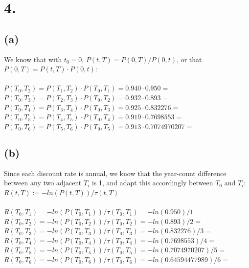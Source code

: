 \documentclass{article}
\begin{document}
\section*{4.}
{\Large 

\subsection*{(a)}
We know that with $t_0 = 0$, $P(t, T) = P(0, T) / P(0, t)$, or that \\
$P(0, T) = P(t, T) \cdot P(0, t)$: \\ \\
$P(T_0, T_2) = P(T_1, T_2) \cdot P(T_0, T_1) = 0.940 \cdot 0.950 = $  \\ 
$P (T_0, T_3) = P(T_2, T_3) \cdot P(T_0, T_2) = 0.932 \cdot 0.893 = $  \\
$P(T_0, T_4) = P(T_3, T_4) \cdot P(T_0, T_3) = 0.925 \cdot 0.832276 = $  \\
$P(T_0, T_5) = P(T_4, T_5) \cdot P(T_0, T_4) = 0.919 \cdot 0.7698553 = $  \\
$P(T_0, T_6) = P(T_5, T_6) \cdot P(T_0, T_5) = 0.913 \cdot 0.7074970207 =  $ 

\subsection*{(b)}

Since each discount rate is annual, we know that the year-count difference between any two adjacent $T_i$ is 1, and adapt this accordingly between $T_0$ and $T_i$: \\ $R(t, T) := -ln(P(t, T)) / \tau(t, T)$ \\ \\
$R(T_0, T_1) = -ln(P(T_0, T_1)) / \tau(T_0, T_1) = -ln(0.950) / 1 = $  \\
$R(T_0, T_2) = -ln(P(T_0, T_2)) / \tau(T_0, T_2) = -ln(0.893) / 2 = $  \\
$R(T_0, T_3) = -ln(P(T_0, T_3)) / \tau(T_0, T_3) = -ln(0.832276) / 3 = $  \\
$R(T_0, T_4) = -ln(P(T_0, T_4)) / \tau(T_0, T_4) = -ln(0.7698553) / 4 = $  \\
$R(T_0, T_5) = -ln(P(T_0, T_5)) / \tau(T_0, T_5) = -ln(0.7074970207) / 5 = $  \\
$R(T_0, T_6) = -ln(P(T_0, T_6)) / \tau(T_0, T_6) = -ln(0.64594477989) / 6 = $  \\


}
\end{document}
